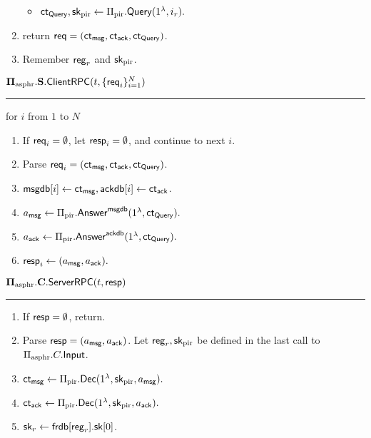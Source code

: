 \begin{definition}
\begin{enumerate}
\begin{itemize}
        \item $\mathsf{ct}_{\mathsf{Query}}, {\mathsf{sk}}_{\text{pir}} \leftarrow \Pi_{\text{pir}}.\mathsf{Query}(1^{\lambda}, i_r).$
    \end{itemize}
    \item return $\mathsf{req} = (\mathsf{ct}_{\mathsf{msg}}, \mathsf{ct}_{\mathsf{ack}}, \mathsf{ct}_{\mathsf{Query}})$.
    \item Remember $\mathsf{reg}_r$ and ${\mathsf{sk}}_{\text{pir}}$.
\end{enumerate}
\vspace{10pt}
$\mathbf{\Pi_{\text{asphr}}.S.\mathsf{ClientRPC}}(t, \{\mathsf{req}_i\}_{i = 1}^N)$
\vspace{5pt}
\hrule
\vspace{5pt}
\item for $i$ from $1$ to $N$
\begin{enumerate}
    \item If $\mathsf{req}_i = \emptyset$, let $\mathsf{resp}_i = \emptyset$, and continue to next $i$. 
    \item Parse $\mathsf{req}_i = (\mathsf{ct}_{\mathsf{msg}}, \mathsf{ct}_{\mathsf{ack}}, \mathsf{ct}_{\mathsf{Query}})$.
    \item $\mathsf{msgdb}[i] \leftarrow \mathsf{ct}_{\mathsf{msg}}, \mathsf{ackdb}[i] \leftarrow \mathsf{ct}_{\mathsf{ack}}$.
    \item $a_{\mathsf{msg}} \leftarrow \Pi_{\text{pir}}.\mathsf{Answer}^{\mathsf{msgdb}}(1^{\lambda}, \mathsf{ct}_{\mathsf{Query}}).$
    \item $a_{\mathsf{ack}} \leftarrow \Pi_{\text{pir}}.\mathsf{Answer}^{\mathsf{ackdb}}(1^{\lambda}, \mathsf{ct}_{\mathsf{Query}}).$
    \item $\mathsf{resp}_i \leftarrow (a_{\mathsf{msg}}, a_{\mathsf{ack}}).$
\end{enumerate}
\vspace{10pt}
$\mathbf{\Pi_{\text{asphr}}.C.\mathsf{ServerRPC}}(t, \mathsf{resp})$
\vspace{5pt}
\hrule
\vspace{5pt}
\begin{enumerate}
    \item If $\mathsf{resp} = \emptyset$, return.
    \item Parse $\mathsf{resp} = (a_{\mathsf{msg}}, a_{\mathsf{ack}})$. Let $\mathsf{reg}_r, {\mathsf{sk}}_{\text{pir}}$ be defined in the last call to $\Pi_{\text{asphr}}.C.\mathsf{Input}$.
    \item $\mathsf{ct}_{\mathsf{msg}} \leftarrow \Pi_{\text{pir}}.\mathsf{Dec}(1^{\lambda}, {\mathsf{sk}}_{\text{pir}}, a_{\mathsf{msg}}).$
    \item $\mathsf{ct}_{\mathsf{ack}} \leftarrow \Pi_{\text{pir}}.\mathsf{Dec}(1^{\lambda}, {\mathsf{sk}}_{\text{pir}}, a_{\mathsf{ack}}).$
    \item ${\mathsf{sk}}_{r} \leftarrow \mathsf{frdb}[\mathsf{reg}_r].{\mathsf{sk}}[0]$.

\end{enumerate}
\end{definition}
